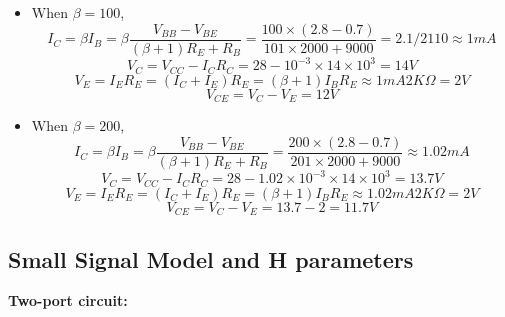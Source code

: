 \begin{itemize}
\begin{itemize}
\item When $\beta=100$, 
\[ I_C=\beta I_B=\beta \frac{V_{BB}-V_{BE}}{(\beta+1) R_E+R_B}
	=\frac{100\times (2.8-0.7)}{101\times 2000+9000}
	=2.1/2110 \approx 1 mA	\]
\[ V_C=V_{CC}-I_CR_C=28-10^{-3} \times 14\times 10^3=14 V	\]
\[ V_E=I_E R_E=(I_C+I_E)R_E=(\beta+1)I_B R_E\approx 1mA 2K\Omega=2V \]
\[ V_{CE}=V_C-V_E=12V \]

\item When $\beta=200$, 
\[ I_C=\beta I_B=\beta\frac{V_{BB}-V_{BE}}{(\beta+1) R_E+R_B}
	=\frac{200\times (2.8-0.7)}{201\times 2000+9000}
	\approx 1.02 mA	\]
\[ V_C=V_{CC}-I_CR_C=28-1.02\times 10^{-3} \times 14\times 10^3=13.7 V	\]
\[ V_E=I_E R_E=(I_C+I_E)R_E=(\beta+1)I_B R_E\approx 1.02mA 2K\Omega=2V \]
\[ V_{CE}=V_C-V_E=13.7-2=11.7V \]
\end{itemize}

\end{itemize}

\subsection*{Small Signal Model and H parameters}

{\bf Two-port circuit:} 


